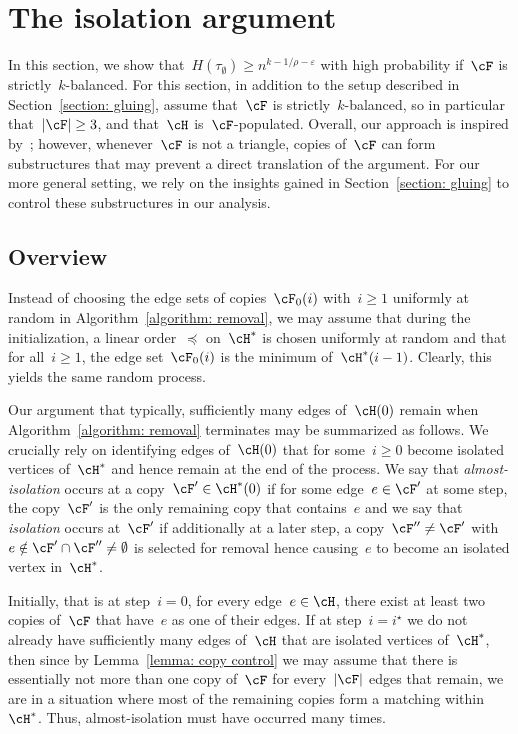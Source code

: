 \documentclass[11pt]{amsart}
\newcommand{\eps}{\varepsilon}
\DeclarePairedDelimiter{\abs}{\lvert}{\rvert}
\newcommand{\cleq}{\preccurlyeq}
\theoremstyle{definition}
\numberwithin{equation}{section}
\begin{document}
	\section{The isolation argument}\label{section: isolation argument}
	
	In this section, we show that~$H(\tau_\emptyset)\geq n^{k-1/\rho-\eps}$ with high probability if~$\cF$ is strictly~$k$-balanced.
	For this section, in addition to the setup described in Section~\ref{section: gluing}, assume that~$\cF$ is strictly~$k$-balanced, so in particular that~$\abs{\cF}\geq 3$, and that~$\cH$ is~$\cF$-populated.
	Overall, our approach is inspired by~\cite[Proof of Theorem~6.1]{BFL:15}; however, whenever~$\cF$ is not a triangle, copies of~$\cF$ can form substructures that may prevent a direct translation of the argument.
	For our more general setting, we rely on the insights gained in Section~\ref{section: gluing} to control these substructures in our analysis.
	
	\subsection{Overview}
	Instead of choosing the edge sets of copies~$\cF_0(i)$ with~$i\geq 1$ uniformly at random in Algorithm~\ref{algorithm: removal}, we may assume that during the initialization, a linear order~$\cleq$ on~$\cH^*$ is chosen uniformly at random and that for all~$i\geq 1$, the edge set~$\cF_0(i)$ is the minimum of~$\cH^*(i-1)$.
	Clearly, this yields the same random process.
	
	Our argument that typically, sufficiently many edges of~$\cH(0)$ remain when Algorithm~\ref{algorithm: removal} terminates may be summarized as follows.
	We crucially rely on identifying edges of~$\cH(0)$ that for some~$i\geq 0$ become isolated vertices of~$\cH^*$ and hence remain at the end of the process.
	We say that \emph{almost-isolation} occurs at a copy~$\cF'\in\cH^*(0)$ if for some edge~$e\in\cF'$ at some step, the copy~$\cF'$ is the only remaining copy that contains~$e$ and we say that \emph{isolation} occurs at~$\cF'$ if additionally at a later step, a copy~$\cF''\neq\cF'$ with~$e\notin \cF'\cap\cF''\neq\emptyset$ is selected for removal hence causing~$e$ to become an isolated vertex in~$\cH^*$.
	
	Initially, that is at step~$i=0$, for every edge~$e\in \cH$, there exist at least two copies of~$\cF$ that have~$e$ as one of their edges.
	If at step~$i=i^\star$ we do not already have sufficiently many edges of~$\cH$ that are isolated vertices of~$\cH^*$, then since by Lemma~\ref{lemma: copy control} we may assume that there is essentially not more than one copy of~$\cF$ for every~$\abs{\cF}$ edges that remain, we are in a situation where most of the remaining copies form a matching within~$\cH^*$.
	Thus, almost-isolation must have occurred many times.
	
\end{document}
